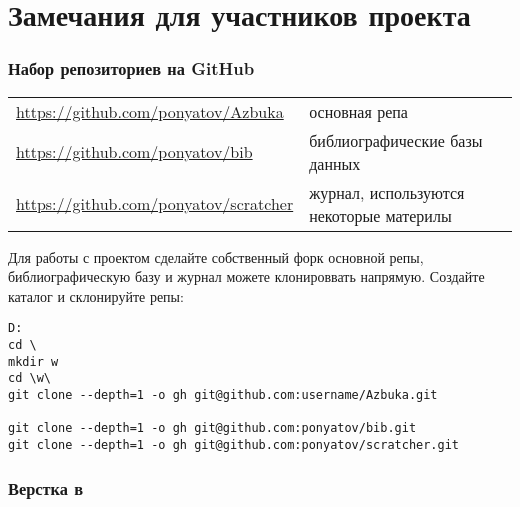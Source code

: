 \part{Замечания для участников проекта}

\section{Набор репозиториев на GitHub}

\begin{tabular}{l l}

\url{https://github.com/ponyatov/Azbuka}
& основная репа \\

\url{https://github.com/ponyatov/bib}
& библиографические базы данных \\

\url{https://github.com/ponyatov/scratcher}
& журнал, используются некоторые материлы \\

\end{tabular}
\bigskip

Для работы с проектом сделайте собственный форк основной репы,
библиографическую базу и журнал можете клонироввать напрямую.
Создайте каталог и склонируйте репы:

\begin{lstlisting}
D:
cd \
mkdir w
cd \w\
git clone --depth=1 -o gh git@github.com:username/Azbuka.git

git clone --depth=1 -o gh git@github.com:ponyatov/bib.git
git clone --depth=1 -o gh git@github.com:ponyatov/scratcher.git
\end{lstlisting}

\section{Верстка в \latex}

